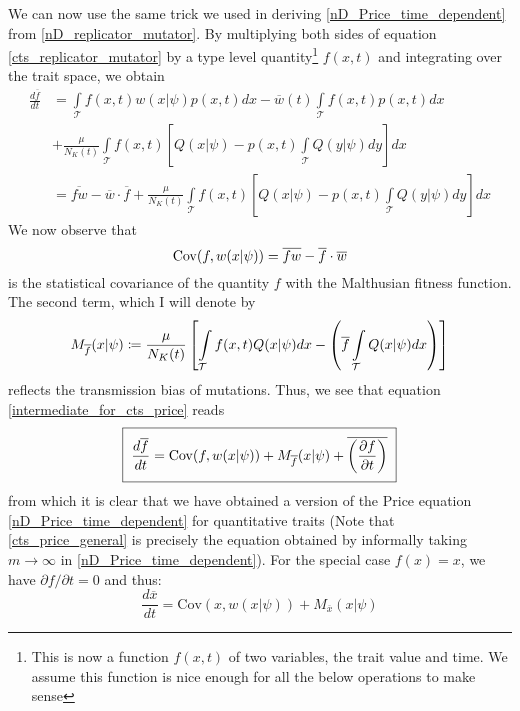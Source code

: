 We can now use the same trick we used in deriving \eqref{nD_Price_time_dependent} from \eqref{nD_replicator_mutator}. By multiplying both sides of equation \eqref{cts_replicator_mutator} by a type level quantity\footnote{This is now a function $f(x,t)$ of two variables, the trait value and time. We assume this function is nice enough for all the below operations to make sense} $f(x,t)$ and integrating over the trait space, we obtain
\begin{align}
\frac{d \overline{f}}{dt} &= \int\limits_{\mathcal{T}}f(x,t)w(x|\psi)p(x,t)dx - \overline{w}(t)\int\limits_{\mathcal{T}}f(x,t)p(x,t)dx\nonumber\\
&+\frac{\mu}{N_K(t)}\int\limits_{\mathcal{T}}f(x,t)\left[Q(x|\psi) - p(x,t)\int\limits_{\mathcal{T}} Q(y|\psi)dy\right]dx\nonumber\\
&= \overline{fw} - \overline{w}\cdot\overline{f} + \frac{\mu}{N_K(t)}\int\limits_{\mathcal{T}}f(x,t)\left[Q(x|\psi) - p(x,t)\int\limits_{\mathcal{T}} Q(y|\psi)dy\right]dx\label{intermediate_for_cts_price}
\end{align}
We now observe that
\begin{equation}
\label{cts_price_cov^{(t)}erm}
\mathrm{Cov}(f,w(x|\psi)) = \overline{fw} - \overline{f}\cdot\overline{w}
\end{equation}
is the statistical covariance of the quantity $f$ with the Malthusian fitness function. The second term, which I will denote by
\begin{equation}
\label{cts_price_drift^{(t)}erm}
M_{\overline{f}}(x|\psi) \coloneqq \frac{\mu}{N_K(t)}\left[\int\limits_{\mathcal{T}}f(x,t)Q(x|\psi)dx - \left(\overline{f}\int\limits_{\mathcal{T}}Q(x|\psi)dx\right)\right] 
\end{equation}
reflects the transmission bias of mutations. Thus, we see that equation \eqref{intermediate_for_cts_price} reads
\begin{equation}
\label{cts_price_general}
\setlength{\fboxsep}{2\fboxsep}\boxed{\frac{d \overline{f}}{dt} = \mathrm{Cov}(f,w(x|\psi)) + M_{\overline{f}}(x|\psi) + \overline{\left(\frac{\partial f}{\partial t}\right)}}
\end{equation}
from which it is clear that we have obtained a version of the Price equation \eqref{nD_Price_time_dependent} for quantitative traits (Note that \eqref{cts_price_general} is precisely the equation obtained by informally taking $m \to \infty$ in \eqref{nD_Price_time_dependent}). For the special case $f(x)=x$, we have $\partial f/\partial t = 0$ and thus:
\begin{equation}
\label{cts_price}
\frac{d \overline{x}}{dt} = \mathrm{Cov}(x,w(x|\psi)) + M_{\overline{x}}(x|\psi)
\end{equation}
